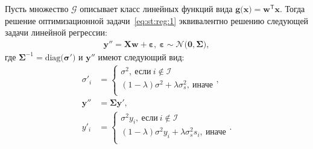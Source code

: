 \begin{theorem}
\label{theorem:st:reg}
Пусть множество $\mathcal{G}$ описывает класс линейных функций вида $\mathbf{g}\bigr(\mathbf{x}\bigr) = \mathbf{w}^{\mathsf{T}}\mathbf{x}.$ Тогда решение оптимизационной задачи~\eqref{eq:st:reg:1} эквивалентно решению следующей задачи линейной регрессии:
\[
\label{eq:st:reg:th:st:1}
\begin{aligned}
\mathbf{y''} = \mathbf{X}\mathbf{w} + \bm{\varepsilon},~\bm{\varepsilon} \sim \mathcal{N}\bigr(\mathbf{0}, \bm{\Sigma}\bigr),
\end{aligned}
\]
где $\bm{\Sigma}^{-1}=\text{diag}\bigr(\bm{\sigma'}\bigr)$ и $\mathbf{y''}$ имеют следующий вид:
\[
\label{eq:st:reg:th:st:2}
\begin{aligned}
\sigma'_{i} &= \begin{cases}
\sigma^2,~\text{если}~i \not \in \mathcal{I}\\
\left(1-\lambda\right)\sigma^2+\lambda\sigma_s^2,~\text{иначе}\\
\end{cases}, \\
\mathbf{y''} &= \bm{\Sigma}\mathbf{y'},\\
y'_i &= \begin{cases}
\sigma^2y_i,~\text{если}~i \not \in \mathcal{I}\\
\left(1-\lambda\right)\sigma^2y_i+\lambda\sigma_s^2s_i,~\text{иначе}\\
\end{cases}.
\end{aligned}
\]
\end{theorem}
